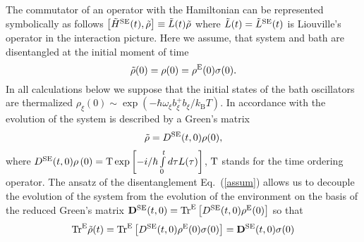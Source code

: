 \documentclass[12pt,twoside,a4paper]{report}
\begin{document}
The commutator of an operator with the Hamiltonian can be represented symbolically as follows
$
\left[  
    \tilde{H}^{\rm SE} (t),  \tilde{\rho} 
\right]  
\equiv 
\tilde {L} ( t ) \tilde{\rho}   
$
where 
$\tilde{L}(t)
             = 
                 \tilde{L}^{\rm SE} (t) $ 
is  Liouville's operator in the interaction picture. 
 Here we 
 assume, that  system and bath are disentangled at the initial moment of time
\begin{equation} 
\tilde{\rho}(0)  
                 =  
                    \rho(0) 
                 =  
                    \rho^{\rm E}( 0)  \sigma (0).   
\label{assum} 
\end{equation} 
In all calculations below we suppose that
the initial states of the bath oscillators are thermalized  
$\rho_\xi (0) \sim \exp (
                          -\hbar \omega _\xi b_\xi ^{+}b_\xi
                           /k_{\mathrm{B}}T
                         )$.
In accordance with \cite{kili86,a16} 
the evolution of the system is described by a Green's matrix 
\begin{equation} 
\label{Green-evolution}
\tilde{\rho}
             =
                 D^{\rm SE}(t,0) \rho(0) ,  
\end{equation}
where  
$%
D^{\rm SE}
 {\left( 
     t,0
  \right) }
  \rho 
     \left( 
         0
     \right) 
                = 
                   {\rm T}\exp{ 
                               \left[
                                -  i/\hbar  \int\limits_0^t d\tau  
                                   L( \tau ) 
                               \right]}   
$, %
${\rm T}$ stands for the time ordering operator.
The ansatz of the disentanglement Eq.~(\ref{assum}) allows us to decouple  
the evolution of the system  
from the evolution of the environment on the basis 
of the reduced Green's matrix 
$%
\mathbf{D}
        ^{\rm SE}
        {( t,0)}
                  = 
                      {\rm Tr}^{\rm E}
                       \left[ 
                           D^{\rm SE}{\left( t,0\right) } 
                           \rho ^{\rm E}(0) 
                       \right]  
$ %
so that 
\begin{equation} 
{\rm Tr}^{\rm E} 
  \tilde{\rho}
           (t)  
               =
                    {\rm Tr}^{\rm E} 
                     \left[
                          D^{\rm SE}{\left( t,0\right) } \rho ^{\rm E}(0)  \sigma (0)  
                     \right] 
               =
                     \mathbf{D}^{\rm SE}{(t,0) }\sigma (0) 
\label{eight} 
\end{equation} 
\end{document}
